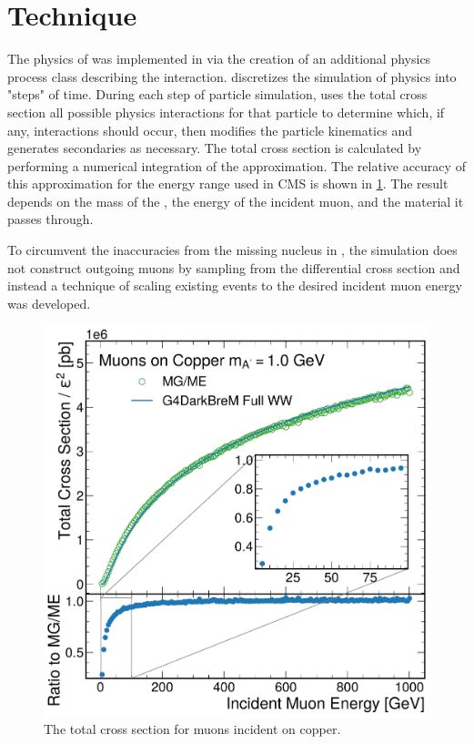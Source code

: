 \section{Technique}
\label{sec:technique}

The physics of \dbrem was implemented in \gf via the creation of an additional physics process class describing the interaction. 
\gf discretizes the simulation of physics into "steps" of time. 
During each step of particle simulation, \gf uses the total cross section all possible physics interactions for that particle to determine which, if any, interactions should occur, then modifies the particle kinematics and generates secondaries as necessary. 
The total cross section is calculated by performing a numerical integration of the \ww approximation.
The relative accuracy of this approximation for the energy range used in CMS is shown in \cref{fig:mu_xsec}.
The result depends on the mass of the \aprime,  the energy of the incident muon, and the material it passes through. 

To circumvent the inaccuracies from the missing nucleus in \ww, the simulation does not construct outgoing muons by sampling from the differential \ww cross section and instead a technique of scaling existing \mg events to the desired incident muon energy was developed. 

\begin{figure}[!htbp]
    \centering
    \includegraphics[width=\textwidth]{figures/mu_xsec.pdf}
    \caption[
        The \dbrem cross section.
    ]{
        The total \dbrem cross section for muons incident on copper. 
    }
    \label{fig:mu_xsec}
\end{figure}

